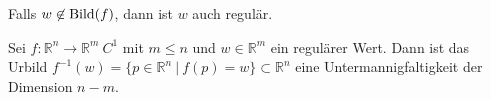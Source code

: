 \documentclass[../main.tex]{subfiles}
\begin{document}
\begin{remark}
Falls $w \not \in \operatorname{Bild} (f)$, dann ist $w$ auch regulär.
\end{remark}

\noindent{}

\begin{theorem}
Sei $f \colon \mathbb{R}^n \to \mathbb{R}^m \ C^1$ mit $m\leq n$ und $w \in \mathbb{R}^m$ ein regulärer Wert.
Dann ist das Urbild $f^{-1}(w) = \{ p \in \mathbb{R}^n \ \vert \ f(p) = w \} \subset \mathbb{R}^n$ eine Untermannigfaltigkeit der Dimension $n-m$.
\end{theorem}
\end{document}
